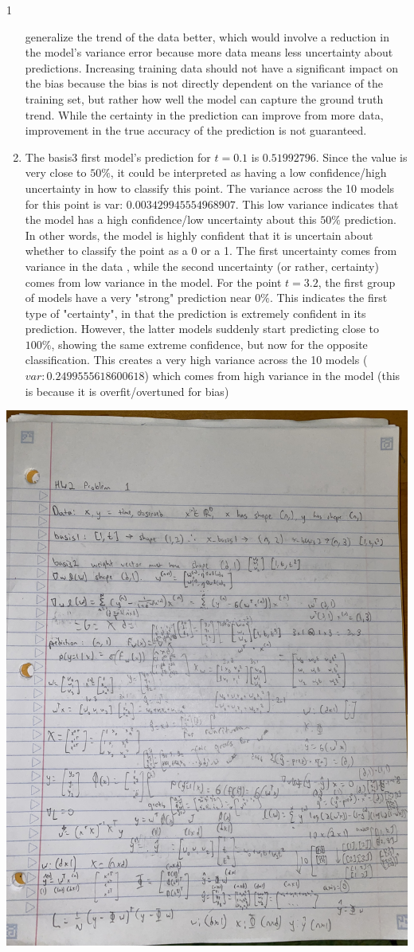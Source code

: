 \documentclass[submit]{harvardml}
\begin{document}
\begin{sol}{}{1}
\begin{enumerate}
    generalize the trend of the data better, which would involve
    a reduction in the model's variance error because more data means
    less uncertainty about predictions. Increasing training data should not have a significant impact
    on the bias because the bias is not directly dependent on the variance
    of the training set, but rather how well the model can capture
    the ground truth trend. While the certainty in the prediction
    can improve from more data, improvement in the true accuracy 
    of the prediction is not guaranteed.
    \item The basis3 first model's prediction for $t = 0.1$ is $0.51992796$. Since
    the value is very close to $50\%$, it could be interpreted as
    having a low confidence/high uncertainty in how to classify this point.
    The variance across the 10 models for this point is var: $0.003429945554968907$.
    This low variance indicates that the model has a high confidence/low uncertainty
    about this $50\%$ prediction. In other words, the model is highly confident
    that it is uncertain about whether to classify the point as a 0 or a 1.
    The first uncertainty comes from variance in the data , while
    the second uncertainty (or rather, certainty) comes from low variance in the model.
    For the point $t = 3.2$, the first group of models have a very "strong"
    prediction near $0\%$. This indicates the first type of "certainty", in that
    the prediction is extremely confident in its prediction. 
    However, the latter models suddenly start predicting close to $100\%$,
    showing the same extreme confidence, but now for the opposite classification.
    This creates a very high variance across the 10 models ($var: 0.2499555618600618$)
    which comes from high variance in the model (this is because it is overfit/overtuned for bias)

  \end{enumerate}

  \includegraphics[angle=270,width=0.4\linewidth]{images/Problem1.JPG}
\end{sol}
\end{document}

